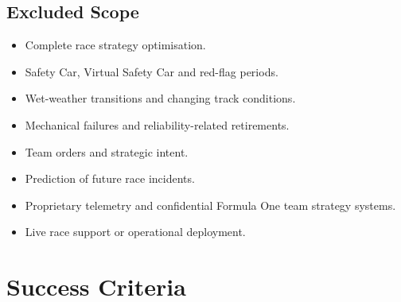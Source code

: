 \subsection{Excluded Scope}

\begin{itemize}
    \item Complete race strategy optimisation.
    \item Safety Car, Virtual Safety Car and red-flag periods.
    \item Wet-weather transitions and changing track conditions.
    \item Mechanical failures and reliability-related retirements.
    \item Team orders and strategic intent.
    \item Prediction of future race incidents.
    \item Proprietary telemetry and confidential Formula One team strategy systems.
    \item Live race support or operational deployment.
\end{itemize}

\section{Success Criteria}
\label{sec:success-criteria}


